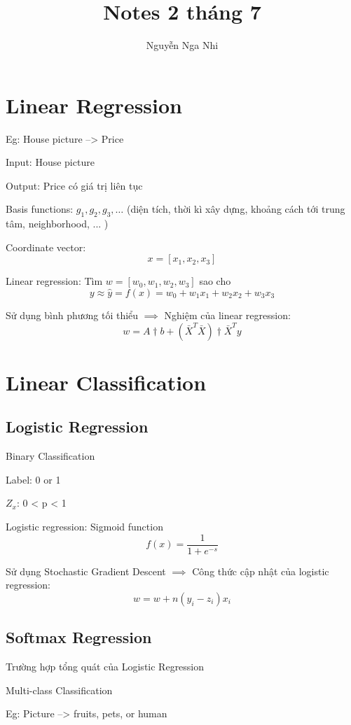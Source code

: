 \documentclass{article}
\title{Notes 2 tháng 7}
\author{Nguyễn Nga Nhi}
\begin{document}
\maketitle

\section{Linear Regression}

Eg: House picture --> Price

Input: House picture

Output: Price có giá trị liên tục

Basis functions: $g_1, g_2, g_3, \dots$
(diện tích, thời kì xây dựng, khoảng cách tới trung tâm, neighborhood, ... )

Coordinate vector:
$$x = [x_1, x_2, x_3]$$

Linear regression:
Tìm $w = [w_0, w_1, w_2, w_3]$
sao cho $$y \approx \hat{y} = f(x) = w_0 + w_1 x_1 + w_2 x_2 + w_3 x_3$$

Sử dụng bình phương tối thiểu $\implies$ Nghiệm của linear regression:
$$w = A\dagger b + (\bar{X}^T\bar{X})\dagger\bar{X}^T y $$

\section{Linear Classification}

\subsection{Logistic Regression}

Binary Classification

Label: 0 or 1

$Z_x$: 0 < p < 1

Logistic regression: Sigmoid function
$$f(x) = \frac{1}{1+e^{-s}}$$

Sử dụng Stochastic Gradient Descent $\implies$ Công thức cập nhật của logistic regression:
$$w = w + n(y_i - z_i)x_i $$

\subsection{Softmax Regression}

Trường hợp tổng quát của Logistic Regression

Multi-class Classification

Eg: Picture --> fruits, pets, or human
\end{document}
